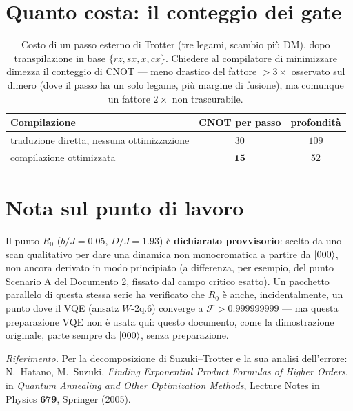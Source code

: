 \documentclass[11pt,a4paper]{article}
\begin{document}

\section{Quanto costa: il conteggio dei gate}

\begin{table}[htbp]
\centering
\small
\renewcommand{\arraystretch}{1.3}
\begin{tabular}{@{}lcc@{}}
\toprule
\rowcolor{grigetto}
\textbf{Compilazione} & \textbf{CNOT per passo} & \textbf{profondità} \\
\midrule
traduzione diretta, nessuna ottimizzazione & $30$ & $109$ \\
compilazione ottimizzata & $\mathbf{15}$ & $52$ \\
\bottomrule
\end{tabular}
\caption{Costo di un passo esterno di Trotter (tre legami, scambio più DM),
dopo transpilazione in base $\{rz,sx,x,cx\}$. Chiedere al compilatore di
minimizzare dimezza il conteggio di CNOT --- meno drastico del fattore
$>3\times$ osservato sul dimero (dove il passo ha un solo legame, più
margine di fusione), ma comunque un fattore $2\times$ non trascurabile.}
\end{table}
\FloatBarrier


\section{Nota sul punto di lavoro}

Il punto $R_0$ ($b/J=0.05$, $D/J=1.93$) è \textbf{dichiarato provvisorio}:
scelto da uno scan qualitativo per dare una dinamica non monocromatica a
partire da $\lvert 000\rangle$, non ancora derivato in modo principiato (a
differenza, per esempio, del punto Scenario A del Documento 2, fissato dal
campo critico esatto). Un pacchetto parallelo di questa stessa serie ha
verificato che $R_0$ è anche, incidentalmente, un punto dove il VQE (ansatz
$W$-2q.6) converge a $\mathcal F>0.999999999$ --- ma questa preparazione VQE
non è usata qui: questo documento, come la dimostrazione originale, parte
sempre da $\lvert 000\rangle$, senza preparazione.

\bigskip
\noindent\footnotesize\textit{Riferimento.} Per la decomposizione di
Suzuki--Trotter e la sua analisi dell'errore: N.~Hatano, M.~Suzuki,
\emph{Finding Exponential Product Formulas of Higher Orders}, in
\emph{Quantum Annealing and Other Optimization Methods}, Lecture Notes in
Physics \textbf{679}, Springer (2005).
\end{document}
